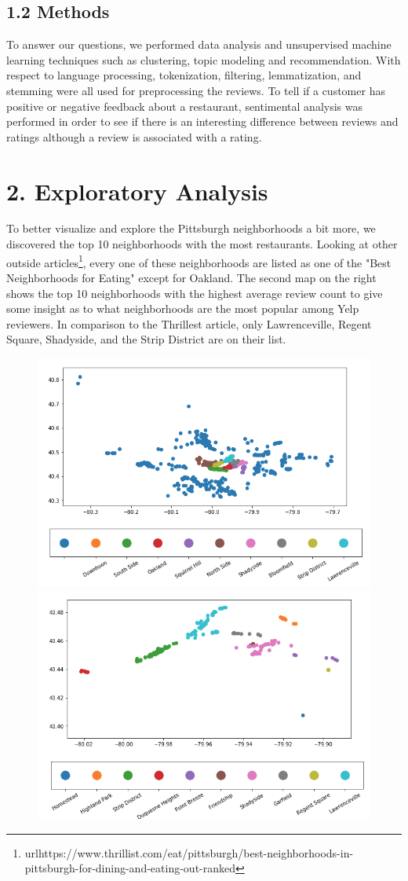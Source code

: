 \documentclass{neu_handout}
\begin{document}
\subsection*{1.2 Methods}
To answer our questions, we performed data analysis and unsupervised machine learning techniques such as clustering, topic modeling and recommendation. With respect to language processing, tokenization, filtering, lemmatization, and stemming were all used for preprocessing the reviews. To tell if a customer has positive or negative feedback about a restaurant, sentimental analysis was performed in order to see if there is an interesting difference between reviews and ratings although a review is associated with a rating.
\section*{2. Exploratory Analysis}
To better visualize and explore the Pittsburgh neighborhoods a bit more, we discovered the top 10 neighborhoods with the most restaurants. Looking at other outside articles\footnote{url{https://www.thrillist.com/eat/pittsburgh/best-neighborhoods-in-pittsburgh-for-dining-and-eating-out-ranked}}, every one of these neighborhoods are listed as one of the "Best Neighborhoods for Eating" except for Oakland. The second map on the right shows the top 10 neighborhoods with the highest average review count to give some insight as to what neighborhoods are the most popular among Yelp reviewers. In comparison to the Thrillest article, only Lawrenceville, Regent Square, Shadyside, and the Strip District are on their list.

\begin{figure}[h]
\centering
{
\includegraphics[width=0.47\linewidth]{pitts_hoods_most_restaurants}
}
{
\includegraphics[width=0.47\linewidth]{top_10_most_popular_neighborhoods}
}
\end{figure}
\end{document}
